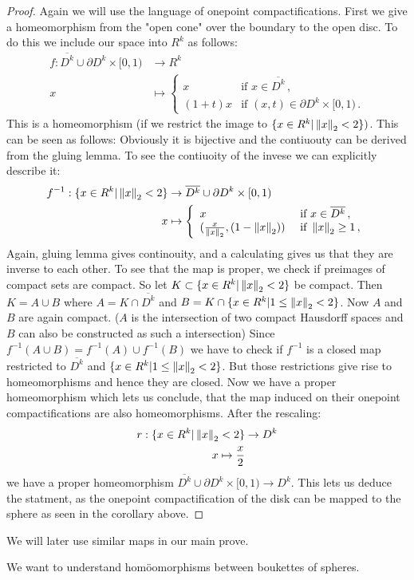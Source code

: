 \begin{proof}
	Again we will use the language of onepoint compactifications. First we give a homeomorphism from the "open cone" over the boundary to the open disc. To do this we include our space into $R^k$ as follows:
	\begin{align*}
	f:	\overline{D^k}\cup \partial D^k \times [0,1) &\to R^{k}\\
		x								 &\mapsto
		 \left\{ \begin{array}{ll}
		 	x & \text{if } x \in \overline{D^k} \, , \\
		 	(1+t)x& \text{if } (x,t)\in \partial D^k \times [0,1) \, . 
		 \end{array}
		 \right.
	\end{align*} This is a homeomorphism (if we restrict the image to $\{x\in R^k| \left\lVert x\right\rVert_2<2\})$. This can be seen as follows:
	Obviously it is bijective and the contiuouty can be derived from the gluing lemma. To see the contiuoity of the invese we can explicitly describe it:
\begin{align*}
	f^{-1}: \{x\in R^k| \left\lVert x\right\rVert_2<2\}  &\to    \overline{D^k}\cup \partial D^k \times [0,1) \\
	x 									&\mapsto \left\{ 
	\begin{array}{ll}
		x & \text{ if } x\in \overline{D^k} \,,  \\
		(\frac{x}{\left\lVert x\right\rVert_2},(1-\left\lVert x\right\rVert_2)) & \text{ if } \left\lVert x\right\rVert_2\geq 1 \,,
	\end{array}
	\right.
\end{align*} Again, gluing lemma gives continouity, and a calculating gives us that they are inverse to each other. To see that the map is proper, we check if preimages of compact sets are compact. So let $K\subset \{x\in R^k| \left\lVert x\right\rVert_2<2\}$ be compact. Then $K=A\cup B$ where $A= K\cap \overline{D^k}$ and $B=K\cap \{x\in R^k| 1\leq \left\lVert x\right\rVert_2<2\}$. Now $A$ and $B$ are again compact. ($A$ is the intersection of two compact Hausdorff spaces and $B$ can also be constructed as such a intersection) Since $f^{-1}(A\cup B)=f^{-1}(A)\cup f^{-1}(B)$ we have to check if $f^{-1}$ is a closed map restricted to $\overline{D^k}$ and $\{x\in R^k| 1\leq \left\lVert x\right\rVert_2<2\}$. But those restrictions give rise to homeomorphisms and hence they are closed. 
Now we have a proper homeomorphism which lets us conclude, that the map induced on their onepoint compactifications are also homeomorphisms.  After the rescaling:
\begin{align*}
	r: \{x\in R^k| \left\lVert x\right\rVert_2<2\} & \to D^k\\
	x\mapsto \frac{x}{2}
\end{align*} we have a proper homeomorphism $\overline{D^k}\cup \partial D^k \times [0,1) \to D^k$.
This lets us deduce the statment, as the onepoint compactification of the disk can be mapped to the sphere as seen in the corollary above.
\end{proof}
We will later use similar maps in our main prove. 
\begin{cor}
We want to understand homöomorphisms between boukettes of spheres. 
\end{cor}
